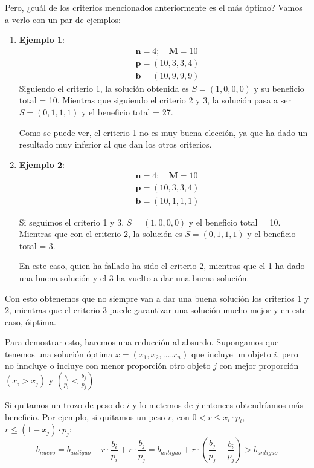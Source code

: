 \documentclass[10pt,a4paper,spanish]{report}
\theoremstyle{definition}
\theoremstyle{remark}
\begin{document}
Pero, ¿cuál de los criterios mencionados anteriormente es el más óptimo? Vamos a verlo con un par de ejemplos:
\begin{enumerate}
    \item \textbf{Ejemplo 1}: 
    \begin{align*}
    &\mathbf{n} = 4; \quad \mathbf{M} = 10\\
    &\mathbf{p}=(10,3,3,4)\\
    &\mathbf{b}=(10,9,9,9)
 \end{align*}
    Siguiendo el criterio 1, la solución obtenida es $S=(1,0,0,0)$ y su beneficio total = 10. Mientras que siguiendo el criterio 2 y 3, la solución pasa a ser $S=(0,1,1,1)$ y el beneficio total = 27.

    Como se puede ver, el criterio 1 no es muy buena elección, ya que ha dado un resultado muy inferior al que dan los otros criterios.

    \item \textbf{Ejemplo 2}:
    \begin{align*}
    &\mathbf{n} = 4; \quad \mathbf{M} = 10\\
    &\mathbf{p}=(10,3,3,4)\\
    &\mathbf{b}=(10,1,1,1)
 \end{align*} 

Si seguimos el criterio 1 y 3. $S=(1,0,0,0)$ y el beneficio total = 10. Mientras que con el criterio 2, la solución es $S=(0,1,1,1)$ y el beneficio total = 3.

En este caso, quien ha fallado ha sido el criterio 2, mientras que el 1 ha dado una buena solución y el 3 ha vuelto a dar una buena solución.
\end{enumerate}

Con esto obtenemos que no siempre van a dar una buena solución los criterios 1 y 2, mientras que el criterio 3 puede garantizar una solución mucho mejor y en este caso, óiptima.

Para demostrar esto, haremos una reducción al absurdo. Supongamos que tenemos una solución óptima $x=(x_1,x_2,\ldots.x_n)$ que incluye un objeto $i$, pero no inncluye o incluye con menor proporción otro objeto $j$ con mejor proporción $(x_i > x_j)$ y $\left(\frac{b_i}{p_i} < \frac{b_j}{p_j} \right)$

Si quitamos un trozo de peso de $i$ y lo metemos de $j$ entonces obtendríamos más beneficio. Por ejemplo, si quitamos un peso $r$, con $0 < r \leq x_i\cdot p_i$, $r \leq (1-x_j)\cdot p_j$:
$$b_{nuevo} = b_{antiguo} - r\cdot\frac{b_i}{p_i}+r\cdot\frac{b_j}{p_j} = b_{antiguo} + r\cdot\left(\frac{b_j}{p_j} - \frac{b_i}{p_j}\right) > b_{antiguo}
$$
\end{document}
